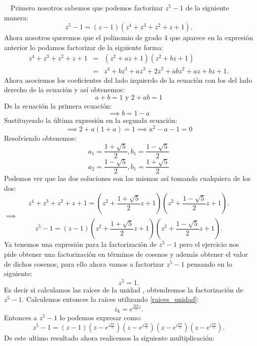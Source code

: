 \documentclass[twoside]{book}
\begin{document}
\begin{sol}
    \begin{solucion}{}

        $\phantom{a}\\$
            Primero nosotros sabemos que podemos factorizar $z^5-1$ de la siguiente manera:
        $$z^5-1=(z-1)(z^4+z^3+z^2+z+1).$$
        Ahora nosotros queremos que el polinomio de grado 4 que aparece en la expresi\'on anterior lo podamos factorizar de la siguiente forma:
        \begin{eqnarray*}
            z^4+z^3+z^2+z+1&=&(z^2+az+1)(z^2+bz+1)\\
            &=&z^4+bz^3+az^3+2z^2+abz^2+az+bz+1.
        \end{eqnarray*}
        Ahora asociemos los coeficientes del lado izquierdo de la ecuaci\'on con los del lado derecho de la ecuaci\'on y as\'i obtenemos:
        $$a+b=1 \text{ y } 2+ab=1$$
        De la ecuaci\'on la primera ecuaci\'on:
        $$ \implies b=1-a$$
        Sustituyendo la \'ultima expresi\'on en la segunda ecuaci\'on:
        $$\implies 2+a(1+a)=1\implies a^2-a-1=0$$
        Resolviendo obtenemos:
        $$a_1=\dfrac{1+\sqrt{5}}{2}, b_1=\dfrac{1-\sqrt{5}}{2}$$
        $$a_2=\dfrac{1-\sqrt{5}}{2}, b_1=\dfrac{1+\sqrt{5}}{2}$$
        Podemos ver que las dos soluciones son las mismas as\'i tomando cualquiera de los dos:
        $$z^4+z^3+z^2+z+1=\left(z^2+\dfrac{1+\sqrt{5}}{2}z+1\right)\left(z^2+\dfrac{1-\sqrt{5}}{2}z+1\right).$$
        $\implies$
        \begin{equation}\label{ejercicio18a}
            z^5-1=(z-1)\left(z^2+\dfrac{1+\sqrt{5}}{2}z+1\right)\left(z^2+\dfrac{1-\sqrt{5}}{2}z+1\right).
        \end{equation}
        Ya tenemos una expresi\'on para la factorizaci\'on de $z^5-1$ pero el ejercicio nos pide obtener una factorizaci\'on en t\'erminos de cosenos y adem\'as obtener el valor de dichos cosenos, para ello ahora vamos a factorizar $z^5-1$ pensando en lo siguiente:
        $$z^5=1.$$
        Es decir si calculamos las ra\'ices de la unidad , obtendremos la factorizaci\'on de $z^5-1$. Calculemos entonces la ra\'ices utilizando \eqref{raices_unidad}:
        $$z_k=e^{\frac{2k\pi}{5}i}.$$
        Entonces a $z^5-1$ lo podemos expresar como:
        $$z^5-1=(z-1)\left(z-e^{i\frac{2\pi}{5}}\right)\left(z-e^{i\frac{4\pi}{5}}\right)\left(z-e^{i\frac{6\pi}{5}}\right)\left(z-e^{i\frac{8\pi}{5}}\right).$$
        De este ultimo resultado ahora realicemos la siguiente multiplicaci\'on:
        \begin{eqnarray*}

\end{eqnarray*}
\end{solucion}
\end{sol}
\end{document}
